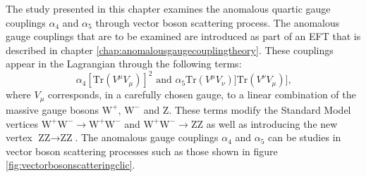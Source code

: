 The study presented in this chapter examines the anomalous quartic gauge couplings $\alpha_{4}$ and $\alpha_{5}$ through vector boson scattering process.  The anomalous gauge couplings that are to be examined are introduced as part of an EFT that is described in chapter \ref{chap:anomalousgaugecouplingtheory}.  These couplings appear in the Lagrangian through the following terms:
%
\begin{equation}
\alpha_{4}[\text{Tr}(V^{\mu}V_{\mu})]^{2} \text{ and } \alpha_{5}\text{Tr}(V^{\mu}V_{\nu})] \text{Tr}(V^{\nu}V_{\mu})]\text{,}
\end{equation}
%
\noindent where $V_{\mu}$ corresponds, in a carefully chosen gauge, to a linear combination of the massive gauge bosons $\text{W}^{+}$, $\text{W}^{-}$ and Z.  These terms modify the Standard Model vertices $\text{W}^{+}\text{W}^{-} \rightarrow \text{W}^{+}\text{W}^{-}$ and $\text{W}^{+}\text{W}^{-} \rightarrow \text{Z}\text{Z}$ as well as introducing the new vertex $\text{Z}\text{Z} \rightarrow \text{Z}\text{Z}$.  The anomalous gauge couplings $\alpha_{4}$ and $\alpha_{5}$ can be studies in vector boson scattering processes such as those shown in figure \ref{fig:vectorbosonscatteringclic}.  

